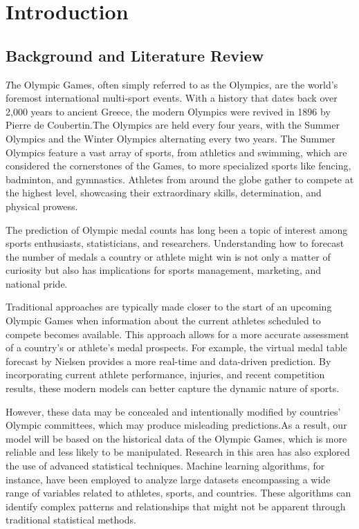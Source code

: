 \section{Introduction}

\subsection{Background and Literature Review}

$T$he Olympic Games, often simply referred to as the Olympics, are the world's foremost international multi-sport events. With a history that dates back over 2,000 years to ancient Greece, the modern Olympics were revived in 1896 by Pierre de Coubertin.The Olympics are held every four years, with the Summer Olympics and the Winter Olympics alternating every two years. The Summer Olympics feature a vast array of sports, from athletics and swimming, which are considered the cornerstones of the Games, to more specialized sports like fencing, badminton, and gymnastics. Athletes from around the globe gather to compete at the highest level, showcasing their extraordinary skills, determination, and physical prowess.

The prediction of Olympic medal counts has long been a topic of interest among sports enthusiasts, statisticians, and researchers. Understanding how to forecast the number of medals a country or athlete might win is not only a matter of curiosity but also has implications for sports management, marketing, and national pride. 

Traditional approaches are typically made closer to the start of an upcoming Olympic Games when information about the current athletes scheduled to compete becomes available. This approach allows for a more accurate assessment of a country's or athlete's medal prospects. For example, the virtual medal table forecast by Nielsen \cite{1} provides a more real-time and data-driven prediction. By incorporating current athlete performance, injuries, and recent competition results, these modern models can better capture the dynamic nature of sports.

However, these data may be concealed and intentionally modified by countries' Olympic committees, which may produce misleading predictions.As a result, our model will be based on the historical data of the Olympic Games, which is more reliable and less likely to be manipulated.
Research in this area has also explored the use of advanced statistical techniques. Machine learning algorithms, for instance, have been employed to analyze large datasets encompassing a wide range of variables related to athletes, sports, and countries. These algorithms can identify complex patterns and relationships that might not be apparent through traditional statistical methods.


